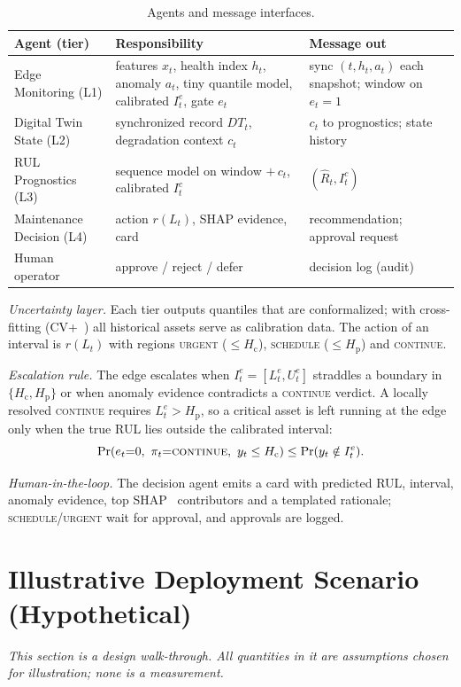 \documentclass[conference]{IEEEtran}
\newcommand{\Hc}{H_{\mathrm{c}}}
\newcommand{\Hp}{H_{\mathrm{p}}}
\begin{document}
\begin{table}[t]
\centering
\caption{Agents and message interfaces.}
\label{tab:agents}
\footnotesize\setlength{\tabcolsep}{2pt}
\begin{tabular}{p{1.55cm}p{3.15cm}p{3.0cm}}
\toprule
Agent (tier) & Responsibility & Message out \\
\midrule
Edge Monitoring (L1) & features $x_t$, health index $h_t$, anomaly $a_t$, tiny quantile model, calibrated $I^e_t$, gate $e_t$ & sync $(t,h_t,a_t)$ each snapshot; window on $e_t{=}1$ \\
Digital Twin State (L2) & synchronized record $DT_t$, degradation context $c_t$ & $c_t$ to prognostics; state history \\
RUL Prognostics (L3) & sequence model on window $+\,c_t$, calibrated $I^c_t$ & $(\hat R_t, I^c_t)$ \\
Maintenance Decision (L4) & action $r(L_t)$, SHAP evidence, card & recommendation; approval request \\
Human operator & approve / reject / defer & decision log (audit) \\
\bottomrule
\end{tabular}
\end{table}

\textit{Uncertainty layer.} Each tier outputs quantiles that are conformalized; with cross-fitting (CV+~\cite{barber2021jackknife}) all historical assets serve as calibration data. The action of an interval is $r(L_t)$ with regions \textsc{urgent} ($\le\Hc$), \textsc{schedule} ($\le\Hp$) and \textsc{continue}.

\textit{Escalation rule.} The edge escalates when $I^e_t=[L^e_t,U^e_t]$ straddles a boundary in $\{\Hc,\Hp\}$ or when anomaly evidence contradicts a \textsc{continue} verdict. A locally resolved \textsc{continue} requires $L^e_t>\Hp$, so a critical asset is left running at the edge only when the true RUL lies outside the calibrated interval:
\begin{equation}
\Pr(e_t{=}0,\ \pi_t{=}\textsc{continue},\ y_t\le\Hc)\le\Pr(y_t\notin I^e_t).
\end{equation}

\textit{Human-in-the-loop.} The decision agent emits a card with predicted RUL, interval, anomaly evidence, top SHAP~\cite{lundberg2017shap} contributors and a templated rationale; \textsc{schedule}/\textsc{urgent} wait for approval, and approvals are logged.

\section{Illustrative Deployment Scenario (Hypothetical)}
\emph{This section is a design walk-through. All quantities in it are assumptions chosen for illustration; none is a measurement.}
\end{document}
